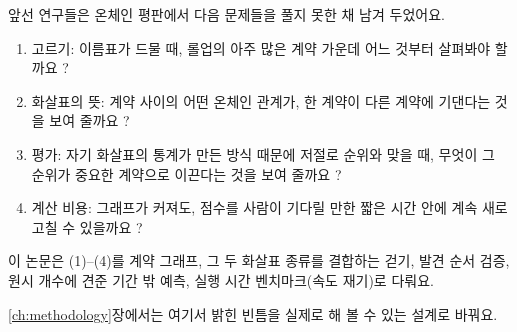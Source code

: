 앞선 연구들은 온체인 평판에서 다음 문제들을 풀지 못한 채 남겨 두었어요.

\begin{enumerate}
\item 고르기: 이름표가 드물 때, 롤업의 아주 많은 계약 가운데 어느 것부터 살펴봐야 할까요 \parencite{lin2024whoiswho}?
\item 화살표의 뜻: 계약 사이의 어떤 온체인 관계가, 한 계약이 다른 계약에 기댄다는 것을 보여 줄까요 \parencite{kitzler2023defi}?
\item 평가: 자기 화살표의 통계가 만든 방식 때문에 저절로 순위와 맞을 때, 무엇이 그 순위가 중요한 계약으로 이끈다는 것을 보여 줄까요 \parencite{cronbach1955construct}?
\item 계산 비용: 그래프가 커져도, 점수를 사람이 기다릴 만한 짧은 시간 안에 계속 새로 고칠 수 있을까요 \parencite{langville2006pagerank}?
\end{enumerate}

이 논문은 (1)--(4)를 계약 그래프, 그 두 화살표 종류를 결합하는 걷기, 발견 순서 검증, 원시 개수에 견준 기간 밖 예측, 실행 시간 벤치마크(속도 재기)로 다뤄요.

\ref{ch:methodology}장에서는 여기서 밝힌 빈틈을 실제로 해 볼 수 있는 설계로 바꿔요.

